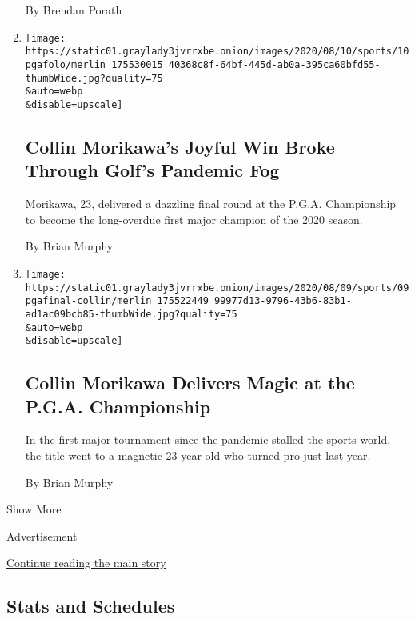 \begin{enumerate}
  By Brendan Porath
\item
  \href{/2020/08/10/sports/golf/collin-morikawa-16th-hole-pga-championship.html}{}

  \texttt{[image: https://static01.graylady3jvrrxbe.onion/images/2020/08/10/sports/10pgafolo/merlin\_175530015\_40368c8f-64bf-445d-ab0a-395ca60bfd55-thumbWide.jpg?quality=75\\\&auto=webp\\\&disable=upscale]}

  \hypertarget{collin-morikawas-joyful-win-broke-through-golfs-pandemic-fog}{%
  \subsection{Collin Morikawa's Joyful Win Broke Through Golf's Pandemic
  Fog}\label{collin-morikawas-joyful-win-broke-through-golfs-pandemic-fog}}

  Morikawa, 23, delivered a dazzling final round at the P.G.A.
  Championship to become the long-overdue first major champion of the
  2020 season.

  By Brian Murphy
\item
  \href{/2020/08/09/sports/golf/pga-championship-collin-morikawa.html}{}

  \texttt{[image: https://static01.graylady3jvrrxbe.onion/images/2020/08/09/sports/09pgafinal-collin/merlin\_175522449\_99977d13-9796-43b6-83b1-ad1ac09bcb85-thumbWide.jpg?quality=75\\\&auto=webp\\\&disable=upscale]}

  \hypertarget{collin-morikawa-delivers-magic-at-the-pga-championship}{%
  \subsection{Collin Morikawa Delivers Magic at the P.G.A.
  Championship}\label{collin-morikawa-delivers-magic-at-the-pga-championship}}

  In the first major tournament since the pandemic stalled the sports
  world, the title went to a magnetic 23-year-old who turned pro just
  last year.

  By Brian Murphy
\end{enumerate}

Show More

Advertisement

\protect\hyperlink{after-mid1}{Continue reading the main story}

\hypertarget{stats-and-schedules}{%
\subsection{Stats and Schedules}\label{stats-and-schedules}}

